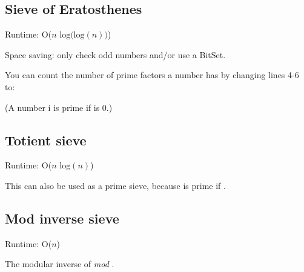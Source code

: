 
\subsection*{Sieve of Eratosthenes}

Runtime: O($n \text{ log(log} (n))$)

Space saving: only check odd numbers and/or use a BitSet.



You can count the number of prime factors a number has by changing lines 4-6 to:



(A number i is prime if  is 0.)

\subsection*{Totient sieve}

Runtime: O($n \text{ log}(n)$)

This can also be used as a prime sieve, because  is prime if .



\subsection*{Mod inverse sieve}

Runtime: O($n$)

The modular inverse of  \textit{mod} .



\newpage